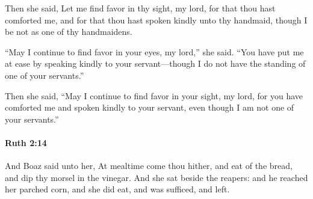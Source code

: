 			\begin{versebox}
					\item[BHS] 
					\item[LXX] 
					\item[ASV] Then she said, Let me find favor in thy sight, my lord, for that thou hast comforted me, and for that thou hast spoken kindly unto thy handmaid, though I be not as one of thy handmaidens.
					\item[NIV] “May I continue to find favor in your eyes, my lord,” she said. “You have put me at ease by speaking kindly to your servant—though I do not have the standing of one of your servants.”
					\item[NRSV] Then she said, “May I continue to find favor in your sight, my lord, for you have comforted me and spoken kindly to your servant, even though I am not one of your servants.”
			\end{versebox}

		\paragraph{Ruth 2:14} %
			\label{RUTH-2-14}

			And Boaz said unto her, At mealtime come thou hither, and eat of the bread, and dip thy morsel in the vinegar. And she sat beside the reapers: and he reached her parched corn, and she did eat, and was sufficed, and left.

